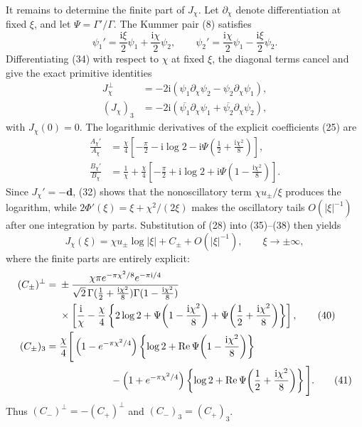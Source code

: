 \documentclass[11pt]{article}
\newcommand{\ii}{\mathrm i}
\newcommand{\Rea}{\operatorname{Re}}
\begin{document}
It remains to determine the finite part of \(J_\chi\). Let \(\partial_\chi\) denote differentiation at fixed \(\xi\), and let \(\Psi=\Gamma'/\Gamma\). The Kummer pair (8) satisfies
\begin{equation}
 \psi_1'=\frac{\ii\xi}{2}\psi_1+\frac{\ii\chi}{2}\psi_2,
 \qquad
 \psi_2'=\frac{\ii\chi}{2}\psi_1-\frac{\ii\xi}{2}\psi_2. \tag{34}
\end{equation}
Differentiating (34) with respect to \(\chi\) at fixed \(\xi\), the diagonal terms cancel and give the exact primitive identities
\begin{align}
 J_\chi^\perp&=-2\ii\left(
 \psi_1\partial_\chi\psi_2-
 \psi_2\partial_\chi\psi_1\right), \tag{35}\\
 (J_\chi)_3&=-2\ii\left(
 \overline{\psi_1}\partial_\chi\psi_1+
 \overline{\psi_2}\partial_\chi\psi_2\right), \tag{36}
\end{align}
with \(J_\chi(0)=0\). The logarithmic derivatives of the explicit coefficients (25) are
\begin{align}
 \frac{A_\chi'}{A_\chi}
 &=\frac{\chi}{4}\left[-\frac\pi2-\ii\log2
 -\ii\Psi\!\left(\frac12+\frac{\ii\chi^2}{8}\right)\right], \tag{37}\\
 \frac{B_\chi'}{B_\chi}
 &=\frac1\chi+\frac{\chi}{4}\left[-\frac\pi2+\ii\log2
 +\ii\Psi\!\left(1-\frac{\ii\chi^2}{8}\right)\right]. \tag{38}
\end{align}
Since \(J_\chi'=-\mathbf d\), (32) shows that the nonoscillatory term \(\chi u_\pm/\xi\) produces the logarithm, while \(2\Phi'(\xi)=\xi+\chi^2/(2\xi)\) makes the oscillatory tails \(O(|\xi|^{-1})\) after one integration by parts. Substitution of (28) into (35)--(38) then yields
\begin{equation}
 J_\chi(\xi)=\chi u_\pm\log|\xi|+C_\pm+O(|\xi|^{-1}),
 \qquad \xi\to\pm\infty, \tag{39}
\end{equation}
where the finite parts are entirely explicit:
\begin{align}
 (C_\pm)^\perp={}&\pm
 \frac{\chi\pi e^{-\pi\chi^2/8}e^{-\pi\ii/4}}
 {\sqrt2\,\Gamma(\frac12+\frac{\ii\chi^2}{8})
 \Gamma(1-\frac{\ii\chi^2}{8})} \notag\\
 &\times\left[
 \frac{\ii}{\chi}-\frac{\chi}{4}\left\{
 2\log2+\Psi\!\left(1-\frac{\ii\chi^2}{8}\right)
 +\Psi\!\left(\frac12+\frac{\ii\chi^2}{8}\right)
 \right\}\right], \tag{40}\\
 (C_\pm)_3={}&\frac{\chi}{4}\Bigg[
 \left(1-e^{-\pi\chi^2/4}\right)
 \left\{\log2+\Rea\Psi\!\left(1-\frac{\ii\chi^2}{8}\right)\right\} \notag\\
 &\hspace{18mm}-\left(1+e^{-\pi\chi^2/4}\right)
 \left\{\log2+\Rea\Psi\!\left(\frac12+\frac{\ii\chi^2}{8}\right)\right\}
 \Bigg]. \tag{41}
\end{align}
Thus \((C_-)^\perp=-(C_+)^\perp\) and \((C_-)_3=(C_+)_3\).
\end{document}
